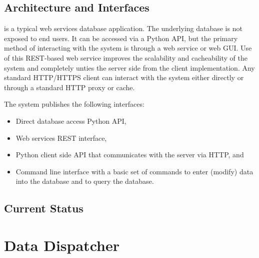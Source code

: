 \documentclass[../main-v1.tex]{subfiles}
\begin{document}
\subsection{Architecture and Interfaces}
 is a typical web services database application. The underlying database is not exposed to end users. It can be accessed via a Python API, but the primary method of interacting with the system is through a web service or web GUI. Use of this REST-based web service 
improves the scalability and cacheability of the system and completely unties the server side from the client implementation. Any standard HTTP/HTTPS client can interact with the system either directly or through a standard HTTP proxy or cache. 


The system publishes the following interfaces: 
\begin{itemize} 
\item Direct database access Python API, 

\item Web services REST interface, 

\item Python client side API that communicates with the server via HTTP, and 

\item 
Command line interface with a basic set of commands to enter (modify) data into the database and to query the database. 
\end{itemize}


\subsection{Current Status} 




\section{Data Dispatcher }
\end{document}
